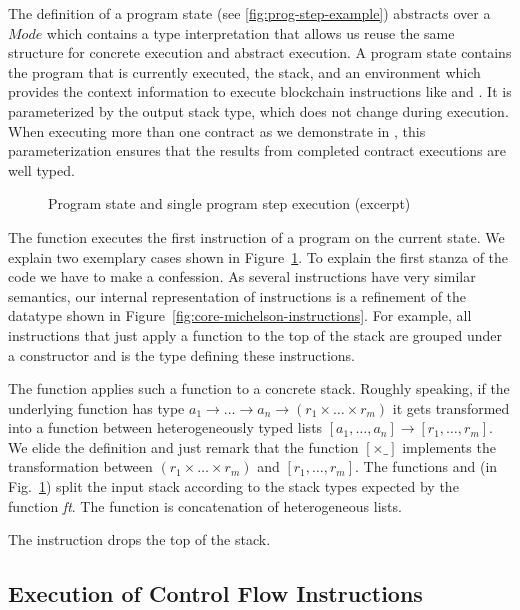 The definition of a program state (see \autoref{fig:prog-step-example}) abstracts over a $Mode$ which
contains a type interpretation that allows us reuse the same structure
for concrete execution and abstract execution.
A program state contains the program that is currently executed,
the stack, and an environment which provides the
context information to execute blockchain instructions like
 and .
It is parameterized by the output stack type, which does not change during execution.
When executing more than one contract as we demonstrate in ,
this parameterization ensures that the results from completed contract executions are well typed.

\begin{figure}[tp]
  \ConcreteProgState
  \ConcreteprogStepfct
  \caption{Program state and single program step execution (excerpt)}
  \label{fig:prog-step-example}
\end{figure}
The function  executes the first instruction of a
program on the current state.
We explain two exemplary cases shown in
Figure~\ref{fig:prog-step-example}.  To explain the first stanza of
the code we have to make a
confession. As several instructions have very similar semantics, our
internal representation of instructions is a refinement of the
datatype shown in Figure~\ref{fig:core-michelson-instructions}. For
example, all instructions that just apply a function to the top of the
stack are grouped under a constructor  and 
is the type defining these instructions.
\FunctionsInstructionfct

The function  applies such a function to a concrete
stack. Roughly speaking, if the underlying function has type $a_1 \to \dots \to a_n \to
(r_1 \times \dots \times r_m)$ it gets transformed into a function
between heterogeneously typed lists
$[a_1, \dots, a_n] \to [r_1, \dots, r_m]$. We elide the definition and
just remark that the function $[{\times}\_]$ implements the
transformation between $(r_1 \times \dots \times r_m)$ and $[r_1,
\dots, r_m]$. The functions  and  (in Fig.~\ref{fig:prog-step-example}) split the
input stack according to the stack types expected by the function \textit{ft}. The
function  is concatenation of heterogeneous lists.

The  instruction drops the top of the stack.


\subsection{Execution of Control Flow Instructions}\label{sec:control-flow}

